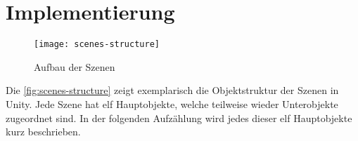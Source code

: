 \section{Implementierung}
\begin{figure}[!htbp]
	\centering
	\texttt{[image: scenes-structure]}
	\caption[Aufbau der Szenen]{Aufbau der Szenen}
	\label{fig:scenes-structure}
\end{figure}

Die \autoref{fig:scenes-structure} zeigt exemplarisch die Objektstruktur der Szenen in Unity. Jede Szene hat elf Hauptobjekte, welche teilweise wieder Unterobjekte zugeordnet sind. In der folgenden Aufzählung wird jedes dieser elf Hauptobjekte kurz beschrieben. 

